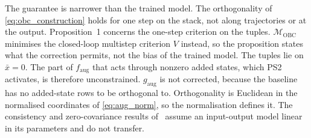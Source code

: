 The guarantee is narrower than the trained model.
The orthogonality of \eqref{eq:obc_construction} holds for one step on the
stack, not along trajectories or at the output.
Proposition~1 concerns the one-step criterion on the tuples.
$\mathcal M_{\mathrm{OBC}}$ minimises the closed-loop multistep criterion $V$
instead, so the proposition states what the correction permits, not the bias
of the trained model.
The tuples lie on $\bar x=0$.
The part of $f_{\mathrm{aug}}$ that acts through nonzero added states, which
PS2 activates, is therefore unconstrained.
$g_{\mathrm{aug}}$ is not corrected, because the baseline has no added-state
rows to be orthogonal to.
Orthogonality is Euclidean in the normalised coordinates of
\eqref{eq:aug_norm}, so the normalisation defines it.
The consistency and zero-covariance results
of~\cite[Thms.~16, 18]{gyorok2026obc} assume an input-output model linear in
its parameters and do not transfer.
